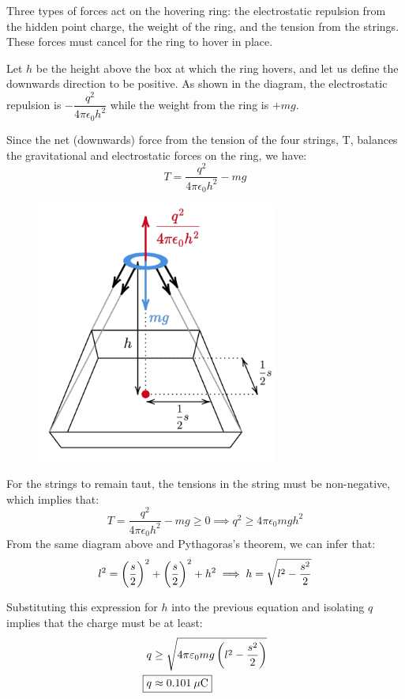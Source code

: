 \begin{solution}
Three types of forces act on the hovering ring: the electrostatic repulsion from the hidden point charge, the weight of the ring, and the tension from the strings. These forces must cancel for the ring to hover in place.

Let $h$ be the height above the box at which the ring hovers, and let us define the downwards direction to be positive. As shown in the diagram, the electrostatic repulsion is $-\dfrac{q^2}{4\pi\epsilon_0h^2}$ while the weight from the ring is $+mg$.

Since the net (downwards) force from the tension of the four strings, T, balances the gravitational and electrostatic forces on the ring, we have:
\[ T=\frac{q^2}{4\pi\epsilon_0h^2}-mg \]

\begin{figure}[H]
    \centering
    \includegraphics[width=8cm]{images/A_Simple_Proposal1.png}
\end{figure}

For the strings to remain taut, the tensions in the string must be non-negative, which implies that:
\[ T=\frac{q^2}{4\pi\epsilon_0h^2}-mg\ge0 \implies q^2\ge4\pi\epsilon_0mgh^2 \]
From the same diagram above and Pythagoras’s theorem, we can infer that:
\[ l^2=\left(\frac{s}{2}\right)^2+\left(\frac{s}{2}\right)^2+h^2 \implies h=\sqrt{l^2-\frac{s^2}{2}} \]

Substituting this expression for $h$ into the previous equation and isolating $q$ implies that the charge must be at least:
\begin{align*}
q &\ge \sqrt{4\pi\epsilon_0mg\brac{l^2-\frac{s^2}{2}}} \\
\Aboxed{q &\approx 0.101\:\mu\unit{C}}
\end{align*}
\end{solution}

\pagebreak